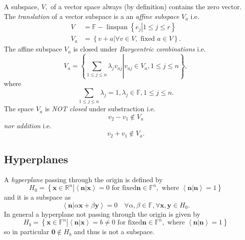 \documentclass[aps,preprint]{revtex4}%
\begin{document}
A subspace, $V,$ of a vector space always (by definition) contains the zero
vector. The \emph{translation} of a vector subspace is a an \emph{affine
subspace} $V_{a}$ i.e.
\begin{align}
V  &  =\mathbb{F}-\operatorname*{linspan}\left\{  \left.  e_{j}\right\vert
1\leq j\leq r\right\} \\
V_{a}  &  =\left\{  \left.  v+a\right\vert \forall v\in V,\text{ fixed }a\in
V\right\}  .
\end{align}
The affine subspace $V_{a}$ is closed under \emph{Barycentric combinations}
i.e.%
\begin{equation}
V_{a}=\left\{  \left.  \sum_{1\leq j\leq n}\lambda_{j}v_{aj}\right\vert
v_{aj}\in V_{a},1\leq j\leq n\right\}  ,
\end{equation}
where
\begin{equation}
\sum_{1\leq j\leq n}\lambda_{j}=1,\lambda_{j}\in\mathbb{F},1\leq j\leq n.
\end{equation}
The space $V_{a}$ is \emph{NOT closed} under substraction i.e.
\begin{equation}
v_{2}-v_{1}\notin V_{a}%
\end{equation}
\emph{nor addition} i.e.
\begin{equation}
v_{2}+v_{1}\notin V_{a}.
\end{equation}


\subsection{ Hyperplanes}

A \emph{hyperplane} passing through the origin is defined by
\begin{equation}
H_{0}=\left\{  \left.  \mathbf{x\in}\mathbb{R}^{n}\right\vert \left\langle
\left.  \mathbf{n}\right\vert \mathbf{x}\right\rangle =0\text{ for fixed
}\mathbf{n\in}\mathbb{F}^{n},\text{ where }\left\langle \left.  \mathbf{n}%
\right\vert \mathbf{n}\right\rangle =1\right\}
\end{equation}
and it is a subspace as
\begin{equation}
\left\langle \left.  \mathbf{n}\right\vert \alpha\mathbf{x+}\beta
\mathbf{y}\right\rangle =0\quad\forall\alpha\mathbf{,}\beta\mathbf{\in
}\mathbb{F},\forall\mathbf{x,y\in}H_{0}.
\end{equation}
In general a hyperplane not passing through the origin is given by
\begin{equation}
H_{b}=\left\{  \left.  \mathbf{x\in}\mathbb{F}^{n}\right\vert \left\langle
\left.  \mathbf{n}\right\vert \mathbf{x}\right\rangle =b\neq0\text{ for fixed
}\mathbf{n\in}\mathbb{F}^{n},\text{ where }\left\langle \left.  \mathbf{n}%
\right\vert \mathbf{n}\right\rangle =1\right\}
\end{equation}
so in particular $\mathbf{0}\mathbf{\notin}H_{b}$ and thus is not a subspace.
\end{document}
